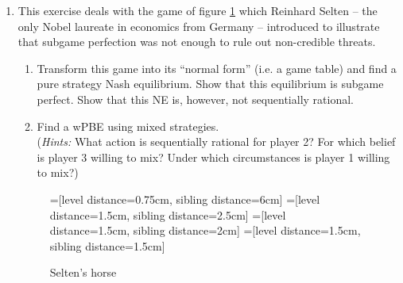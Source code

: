 \documentclass[a4paper,12pt]{article}
\begin{document}
\begin{enumerate}[resume]
  \item This exercise deals with the game of figure \ref{fig:selten_ex} which Reinhard Selten -- the only Nobel laureate in economics from Germany -- introduced to illustrate that subgame perfection was not enough to rule out non-credible threats.
    \begin{enumerate}
    \item Transform this game into its ``normal form'' (i.e. a game table) and find a pure strategy Nash equilibrium. Show that this equilibrium is subgame perfect. Show that this NE is, however, not sequentially rational. 
    \item Find a wPBE using mixed strategies.\\ (\emph{Hints:} What action is sequentially rational for player 2? For which belief is player 3 willing to mix? Under which circumstances is player 1 willing to mix?)
    \end{enumerate}
    \begin{figure}[h]
\centering
=[level distance=0.75cm, sibling distance=6cm]
=[level distance=1.5cm, sibling distance=2.5cm]
=[level distance=1.5cm, sibling distance=2cm]
=[level distance=1.5cm, sibling distance=1.5cm]
\caption{Selten's horse}
\label{fig:selten_ex}
\end{figure}


\end{enumerate}
\end{document}
